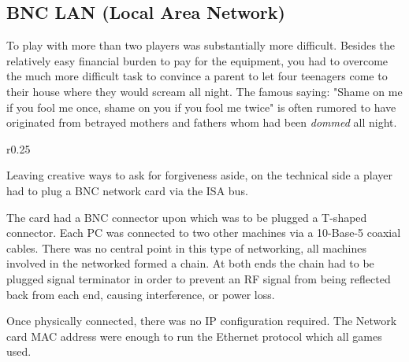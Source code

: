\subsection{BNC LAN (Local Area Network)}
To play with more than two players was substantially more difficult. Besides the relatively easy financial burden to pay for the equipment, you had to overcome the much more difficult task to convince a parent to let four teenagers come to their house where they would scream all night. The famous saying: "Shame on me if you fool me once, shame on you if you fool me twice" is often rumored to have originated from betrayed mothers and fathers whom had been \textit{dommed} all night.\\
\par


\begin{wrapfigure}[7]{r}{0.25\textwidth}
\centering
{}
\end{wrapfigure}

Leaving creative ways to ask for forgiveness aside, on the technical side a player had to plug a BNC network card via the ISA bus.\\
\par The card had a BNC connector upon which was to be plugged a T-shaped connector. Each PC was connected to two other machines via a 10-Base-5 coaxial cables. There was no central point in this type of networking, all machines involved in the networked formed a chain. At both ends the chain had to be plugged signal terminator in order to prevent an RF signal from being reflected back from each end, causing interference, or power loss.\\
\par

\begin{figure}
\centering
{}
\end{figure}

\par
Once physically connected, there was no IP configuration required. The Network card MAC address were enough to run the Ethernet protocol which all games used.\\
\par











